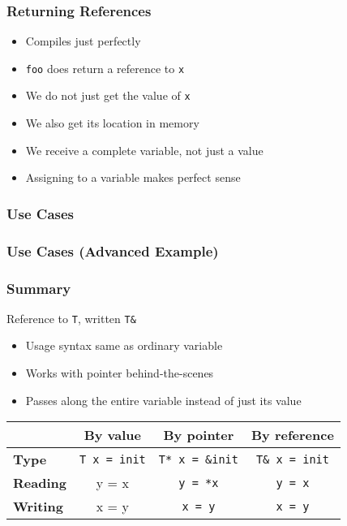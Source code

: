 \begin{frame}
  \frametitle{Returning References}
  \begin{itemize}
    \item Compiles just perfectly
    \item {\tt foo} does return a reference to {\tt x}
    \item We do not just get the value of {\tt x}
    \item We also get its location in memory
    \item We receive a complete variable, not just a value
    \item Assigning to a variable makes perfect sense
  \end{itemize}
\end{frame}

\begin{frame}
  \frametitle{Use Cases}
\end{frame}

\begin{frame}
  \frametitle{Use Cases (Advanced Example)}
\end{frame}

\begin{frame}
  \frametitle{Summary}
  \begin{center}
    \Large Reference to {\tt T}, written {\tt T\&}
  \end{center}
  \begin{itemize}
    \item Usage syntax same as ordinary variable
    \item Works with pointer behind-the-scenes
    \item Passes along the entire variable instead of just its value
  \end{itemize}
  \vskip5mm
  \begin{center}
    \begin{tabular}{lccc}
      & \textbf{By value} & \textbf{By pointer} & \textbf{By reference} \\
      \toprule
      \textbf{Type} & {\tt T x = init} & {\tt T* x = \&init} & {\tt T\& x = init} \\
      \textbf{Reading} & {y = x} & {\tt y = *x} & {\tt y = x} \\
      \textbf{Writing} & {x = y} & {\tt *x = y} & {\tt x = y} \\
    \end{tabular}
  \end{center}
\end{frame}





